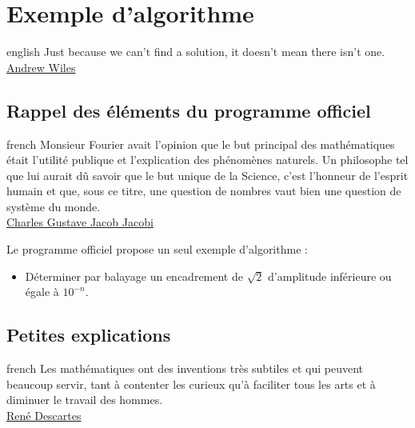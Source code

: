 \documentclass[a4paper, 11pt, twoside]{book}
\begin{document}
\part{Exemple d'algorithme}
\label{sec:org283c364}
\startcontents[level-1]
\begin{foreigndisplayquote}{english}
Just because we can’t find a solution, it doesn’t mean there isn’t
one.\\

\href{https://en.wikipedia.org/wiki/Andrew\_Wiles}{Andrew Wiles}
\end{foreigndisplayquote}

\chapter{Rappel des éléments du programme officiel}
\label{sec:org2cc4231}
\startcontents[level-2]

\begin{foreigndisplayquote}{french}
Monsieur Fourier avait l'opinion que le but principal des
mathématiques était l'utilité publique et l'explication des
phénomènes naturels. Un philosophe tel que lui aurait dû savoir que
le but unique de la Science, c'est l'honneur de l'esprit humain et
que, sous ce titre, une question de nombres vaut bien une question
de système du monde.\\

\href{https://fr.wikipedia.org/wiki/Charles\_Gustave\_Jacob\_Jacobi}{Charles Gustave Jacob Jacobi}
\end{foreigndisplayquote}

Le programme officiel propose un seul exemple d'algorithme :
\begin{itemize}
\item Déterminer par balayage un encadrement de \(\sqrt{2}\) d'amplitude
inférieure ou égale à \(10^{-n}\).
\end{itemize}
\stopcontents[level-2]

\chapter{Petites explications}
\label{sec:org3c07af2}
\startcontents[level-2]

\begin{foreigndisplayquote}{french}
Les mathématiques ont des inventions très subtiles et qui peuvent
beaucoup servir, tant à contenter les curieux qu'à faciliter tous
les arts et à diminuer le travail des hommes. \\

\href{https://fr.wikipedia.org/wiki/Ren\%C3\%A9\_Descartes}{René Descartes}
\end{foreigndisplayquote}
\end{document}
